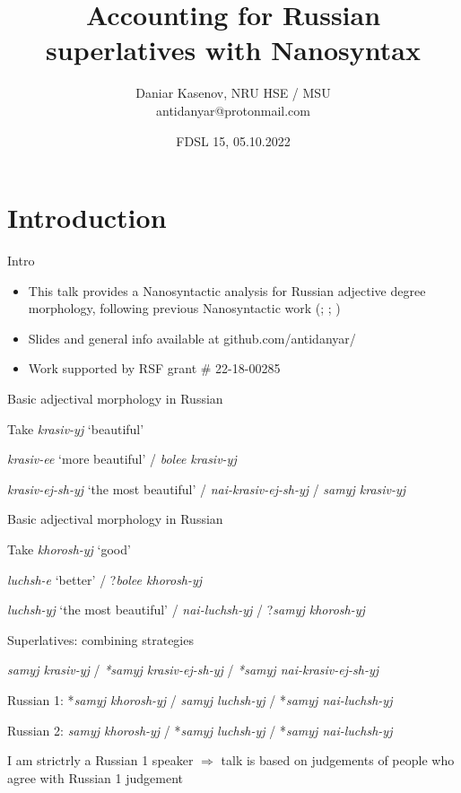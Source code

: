 \documentclass[xcolor=table]{beamer}
\title{Accounting for Russian superlatives with Nanosyntax}
\date{FDSL 15, 05.10.2022}
\author{Daniar Kasenov, NRU HSE / MSU\\ antidanyar@protonmail.com}
\begin{document}
	\maketitle
		
	\section{Introduction}

	\begin{frame}{Intro}

		\begin{itemize}

			\item This talk provides a Nanosyntactic analysis for Russian adjective degree morphology, following previous Nanosyntactic work (\cite{Caha:2019}; \cite{Caha:2020}; \cite{Caha:2022})

			\item Slides and general info available at github.com/antidanyar/

			\item Work supported by RSF grant \# 22-18-00285

		\end{itemize}

	\end{frame}

	\begin{frame}{Basic adjectival morphology in Russian}

		Take \textit{krasiv-yj} `beautiful'

		\textit{krasiv-ee} `more beautiful' / \textit{bolee krasiv-yj}

		\textit{krasiv-ej-sh-yj} `the most beautiful' / \textit{nai-krasiv-ej-sh-yj} / \textit{samyj krasiv-yj}

	\end{frame}

	\begin{frame}{Basic adjectival morphology in Russian}

		Take \textit{khorosh-yj} `good'

		\textit{luchsh-e} `better' / ?\textit{bolee khorosh-yj}

		\textit{luchsh-yj} `the most beautiful' / \textit{nai-luchsh-yj} / ?\textit{samyj khorosh-yj}

	\end{frame}

	\begin{frame}{Superlatives: combining strategies}

		\textit{samyj krasiv-yj} / \textit{*samyj krasiv-ej-sh-yj} / \textit{*samyj nai-krasiv-ej-sh-yj}

		Russian 1: *\textit{samyj khorosh-yj} / \textit{samyj luchsh-yj} / *\textit{samyj nai-luchsh-yj}

		Russian 2: \textit{samyj khorosh-yj} / *\textit{samyj luchsh-yj} / *\textit{samyj nai-luchsh-yj}

		I am strictrly a Russian 1 speaker $\Rightarrow$ talk is based on judgements of people who agree with Russian 1 judgement

	\end{frame}
\end{document}
